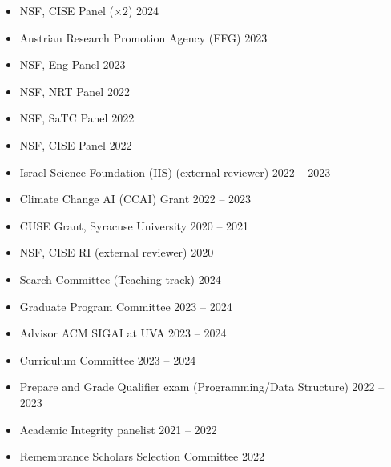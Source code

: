 \begin{itemize}
  \item 
  NSF, CISE Panel \;($\times 2$) \hfill {2024}%
  \item 
  Austrian Research Promotion Agency (FFG) \hfill {2023}
  \item 
  NSF, Eng Panel \hfill {2023}
  \item 
  NSF, NRT Panel \hfill {2022}
  \item 
  NSF, SaTC Panel \hfill {2022} %
  \item 
  NSF, CISE Panel \hfill {2022} %
  \item 
  Israel Science Foundation (IIS) (external reviewer) \hfill {2022 -- 2023}
  \item 
  Climate Change AI (CCAI) Grant \hfill {2022 -- 2023}
  \item 
  CUSE Grant, Syracuse University \hfill {2020 -- 2021}
  \item 
  NSF, CISE RI (external reviewer) \hfill {2020}
\end{itemize}

  \begin{itemize}
    \item Search Committee (Teaching track) \hfill 2024
    \item Graduate Program Committee \hfill 2023 -- 2024
    \item Advisor ACM SIGAI at UVA  \hfill 2023 -- 2024
  \end{itemize}

  \begin{itemize}
    \item Curriculum Committee \hfill 2023 -- 2024
    \item Prepare and Grade Qualifier exam (Programming/Data Structure) \hfill 2022 -- 2023
    \item Academic Integrity panelist \hfill 2021 -- 2022
    \item Remembrance Scholars Selection Committee \hfill 2022
  \end{itemize}